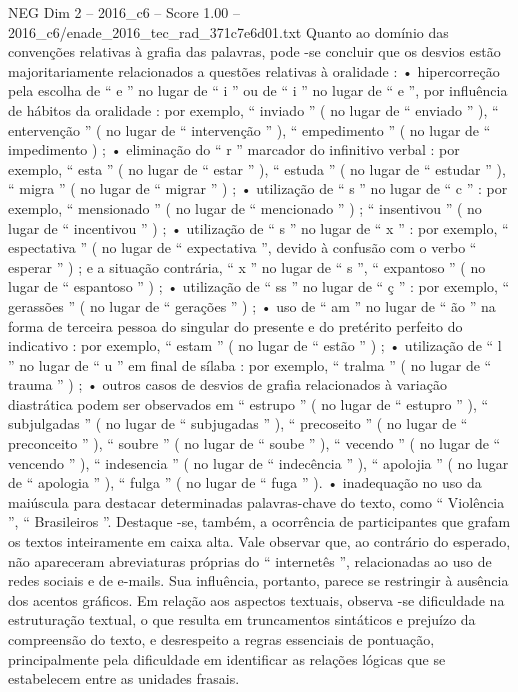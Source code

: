 \begin{textsample}{NEG Dim 2 – 2016\_c6 – Score 1.00 – 2016\_c6/enade\_2016\_tec\_rad\_371c7e6d01.txt}
Quanto ao domínio das convenções relativas à grafia das palavras, pode -se concluir que os desvios estão majoritariamente relacionados a questões relativas à oralidade : • hipercorreção pela escolha de “ e ” no lugar de “ i ” ou de “ i ” no lugar de “ e ”, por influência de hábitos da oralidade : por exemplo, “ inviado ” ( no lugar de “ enviado ” ), “ entervenção ” ( no lugar de “ intervenção ” ), “ empedimento ” ( no lugar de “ impedimento ) ; • eliminação do “ r ” marcador do infinitivo verbal : por exemplo, “ esta ” ( no lugar de “ estar ” ), “ estuda ” ( no lugar de “ estudar ” ), “ migra ” ( no lugar de “ migrar ” ) ; • utilização de “ s ” no lugar de “ c ” : por exemplo, “ mensionado ” ( no lugar de “ mencionado ” ) ; “ insentivou ” ( no lugar de “ incentivou ” ) ; • utilização de “ s ” no lugar de “ x ” : por exemplo, “ espectativa ” ( no lugar de “ expectativa ”, devido à confusão com o verbo “ esperar ” ) ; e a situação contrária, “ x ” no lugar de “ s ”, “ expantoso ” ( no lugar de “ espantoso ” ) ; • utilização de “ ss ” no lugar de “ ç ” : por exemplo, “ gerassões ” ( no lugar de “ gerações ” ) ; • uso de “ am ” no lugar de “ ão ” na forma de terceira pessoa do singular do presente e do pretérito perfeito do indicativo : por exemplo, “ estam ” ( no lugar de “ estão ” ) ; • utilização de “ l ” no lugar de “ u ” em final de sílaba : por exemplo, “ tralma ” ( no lugar de “ trauma ” ) ; • outros casos de desvios de grafia relacionados à variação diastrática podem ser observados em “ estrupo ” ( no lugar de “ estupro ” ), “ subjulgadas ” ( no lugar de “ subjugadas ” ), “ precoseito ” ( no lugar de “ preconceito ” ), “ soubre ” ( no lugar de “ soube ” ), “ vecendo ” ( no lugar de “ vencendo ” ), “ indesencia ” ( no lugar de “ indecência ” ), “ apolojia ” ( no lugar de “ apologia ” ), “ fulga ” ( no lugar de “ fuga ” ). • inadequação no uso da maiúscula para destacar determinadas palavras-chave do texto, como “ Violência ”, “ Brasileiros ”.
Destaque -se, também, a ocorrência de participantes que grafam os textos inteiramente em caixa alta.
Vale observar que, ao contrário do esperado, não apareceram abreviaturas próprias do “ internetês ”, relacionadas ao uso de redes sociais e de e-mails.
Sua influência, portanto, parece se restringir à ausência dos acentos gráficos.
Em relação aos aspectos textuais, observa -se dificuldade na estruturação textual, o que resulta em truncamentos sintáticos e prejuízo da compreensão do texto, e desrespeito a regras essenciais de pontuação, principalmente pela dificuldade em identificar as relações lógicas que se estabelecem entre as unidades frasais.

\end{textsample}

